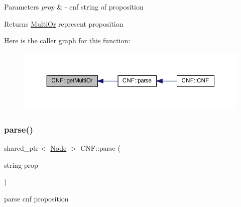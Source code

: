 \begin{DoxyParams}{Parameters}
{\em prop} & -\/ cnf string of proposition \\
\hline
\end{DoxyParams}
\begin{DoxyReturn}{Returns}
\hyperlink{class_multi_or}{Multi\+Or} represent proposition 
\end{DoxyReturn}
Here is the caller graph for this function\+:\nopagebreak
\begin{figure}[H]
\begin{center}
\leavevmode
\includegraphics[width=350pt]{dc/d0e/class_c_n_f_af2c396e921388daa2e99b6fef25b6697_icgraph}
\end{center}
\end{figure}
\mbox{\label{class_c_n_f_a5232071e600e1bfbb76ad7d0e10d7d92}} 
\subsubsection{\texorpdfstring{parse()}{parse()}}
{\footnotesize\ttfamily shared\+\_\+ptr$<$ \hyperlink{class_node}{Node} $>$ C\+N\+F\+::parse (\begin{DoxyParamCaption}\item[{string}]{prop }\end{DoxyParamCaption})\hspace{0.3cm}{\ttfamily [private]}}



parse cnf proposition 


